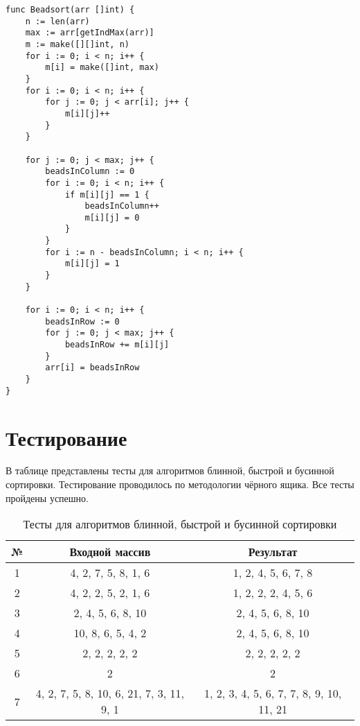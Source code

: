 \begin{code}
\caption{Листинг алгоритма сортировки бусинами}
\label{code:bead}
\begin{verbatim}
func Beadsort(arr []int) {
	n := len(arr)
	max := arr[getIndMax(arr)]
	m := make([][]int, n)
	for i := 0; i < n; i++ {
		m[i] = make([]int, max)
	}
	for i := 0; i < n; i++ {
		for j := 0; j < arr[i]; j++ {
			m[i][j]++
		}
	}

	for j := 0; j < max; j++ {
		beadsInColumn := 0
		for i := 0; i < n; i++ {
			if m[i][j] == 1 {
				beadsInColumn++
				m[i][j] = 0
			}
		}
		for i := n - beadsInColumn; i < n; i++ {
			m[i][j] = 1
		}
	}

	for i := 0; i < n; i++ {
		beadsInRow := 0
		for j := 0; j < max; j++ {
			beadsInRow += m[i][j]
		}
		arr[i] = beadsInRow
	}
}
\end{verbatim}
\end{code}

\section{Тестирование}
В таблице  представлены тесты для алгоритмов блинной, быстрой и бусинной сортировки. Тестирование проводилось по методологии чёрного ящика. Все тесты пройдены успешно.

\begin{table}[H]
  \caption{\label{table:tests} Тесты для алгоритмов блинной, быстрой и бусинной сортировки}
  \begin{center}
    \begin{tabular}{|c|c|c|}
      \hline
      № &  Входной массив & Результат \\ \hline
      1 & 4, 2, 7, 5, 8, 1, 6 & 1, 2, 4, 5, 6, 7, 8 \\ \hline
      2 & 4, 2, 2, 5, 2, 1, 6 & 1, 2, 2, 2, 4, 5, 6 \\ \hline
      3 & 2, 4, 5, 6, 8, 10 & 2, 4, 5, 6, 8, 10 \\ \hline
      4 & 10, 8, 6, 5, 4, 2 & 2, 4, 5, 6, 8, 10  \\ \hline
      5 & 2, 2, 2, 2, 2 & 2, 2, 2, 2, 2\\ \hline
      6 & 2 & 2 \\ \hline
      7 & 4, 2, 7, 5, 8, 10, 6, 21, 7, 3, 11, 9, 1 & 1, 2, 3, 4, 5, 6, 7, 7, 8, 9, 10, 11, 21 \\ \hline
    \end{tabular}
  \end{center}
\end{table}

\newpage